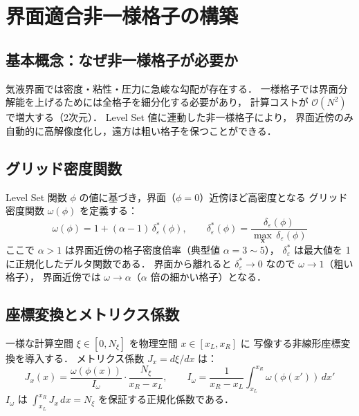 \documentclass[12pt, a4paper, titlepage]{article}
\newcommand{\jp}[1]{{\normalfont\jpfont #1}}
\newcommand{\de}{\delta_\varepsilon}
\newcommand{\Ord}[1]{\mathcal{O}(#1)}
\begin{document}
\section{\jp{界面適合非一様格子の構築}}
\label{sec:grid}

\subsection{\jp{基本概念：なぜ非一様格子が必要か}}

\jp{気液界面では密度・粘性・圧力に急峻な勾配が存在する．
一様格子では界面分解能を上げるためには全格子を細分化する必要があり，
計算コストが $\Ord{N^2}$ で増大する（2次元）．
Level Set 値に連動した非一様格子により，
界面近傍のみ自動的に高解像度化し，遠方は粗い格子を保つことができる．}

\subsection{\jp{グリッド密度関数}}

\jp{Level Set 関数 $\phi$ の値に基づき，界面（$\phi=0$）近傍ほど高密度となる
グリッド密度関数 $\omega(\phi)$ を定義する：}
\begin{equation}
  \omega(\phi) = 1 + (\alpha - 1)\,\de^*(\phi),
  \qquad
  \de^*(\phi) = \frac{\de(\phi)}{\displaystyle\max_{\bm{x}}\,\de(\phi)}
  \label{eq:density_func}
\end{equation}
\jp{ここで $\alpha > 1$ は界面近傍の格子密度倍率（典型値 $\alpha = 3\sim5$），
$\de^*$ は最大値を 1 に正規化したデルタ関数である．
界面から離れると $\de^*\to0$ なので $\omega\to1$（粗い格子），
界面近傍では $\omega\to\alpha$（$\alpha$ 倍の細かい格子）となる．}

\subsection{\jp{座標変換とメトリクス係数}}

\jp{一様な計算空間 $\xi \in [0, N_\xi]$ を物理空間 $x \in [x_L, x_R]$ に
写像する非線形座標変換を導入する．
メトリクス係数 $J_x = d\xi/dx$ は：}
\begin{equation}
  J_x(x) = \frac{\omega(\phi(x))}{I_\omega}\cdot\frac{N_\xi}{x_R - x_L},
  \qquad
  I_\omega = \frac{1}{x_R - x_L}\int_{x_L}^{x_R}\omega(\phi(x'))\,dx'
  \label{eq:metrics}
\end{equation}
\jp{$I_\omega$ は $\int_{x_L}^{x_R} J_x\,dx = N_\xi$ を保証する正規化係数である．}
\end{document}
